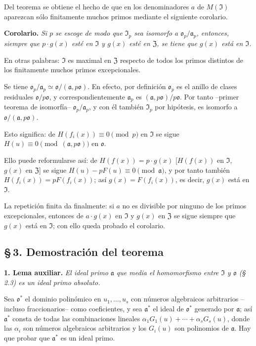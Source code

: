 Del teorema se obtiene el hecho de que en los denominadores $a$ de $M(\mathfrak{I})$ aparezcan sólo finitamente muchos primos mediante el siguiente corolario.

\medskip\noindent\textbf{Corolario.}
\emph{Si $p$ se escoge de modo que $\mathfrak{I}_p$ sea isomorfo a $\mathfrak{o}_p/\mathfrak{a}_p$, entonces, siempre que $p\cdot g(x)$ esté en $\mathfrak{I}$ y $g(x)$ esté en $\mathfrak{Z}$, se tiene que $g(x)$ está en $\mathfrak{I}$.}

En otras palabras: $\mathfrak{I}$ es maximal en $\mathfrak{Z}$ respecto de todos los primos distintos de los finitamente muchos primos excepcionales.

Se tiene $\mathfrak{o}_p/\mathfrak{a}_p\simeq\mathfrak{o}/(\mathfrak{a},p\mathfrak{o})$. En efecto, por definición $\mathfrak{o}_p$ es el anillo de clases residuales $\mathfrak{o}/p\mathfrak{o}$, y correspondientemente $\mathfrak{a}_p$ es $(\mathfrak{a},p\mathfrak{o})/p\mathfrak{o}$. Por tanto --primer teorema de isomorfía-- $\mathfrak{o}_p/\mathfrak{a}_p$, y con él también $\mathfrak{I}_p$ por hipótesis, es isomorfo a $\mathfrak{o}/(\mathfrak{a},p\mathfrak{o})$.

Esto significa: de $H(f_i(x))\equiv0\pmod p$ en $\mathfrak{I}$ se sigue $H(u)\equiv0\pmod{(\mathfrak{a},p\mathfrak{o})}$ en $\mathfrak{o}$.

Ello puede reformularse así: de $H(f(x))=p\cdot g(x)$ [$H(f(x))$ en $\mathfrak{I}$, $g(x)$ en $\mathfrak{Z}$] se sigue $H(u)-pF(u)\equiv0\pmod{\mathfrak{a}}$, y por tanto también $H(f_i(x))=pF(f_i(x))$; así $g(x)=F(f_i(x))$, es decir, $g(x)$ está en $\mathfrak{I}$.

La repetición finita da finalmente: si $a$ no es divisible por ninguno de los primos excepcionales, entonces de $a\cdot g(x)$ en $\mathfrak{I}$ y $g(x)$ en $\mathfrak{Z}$ se sigue siempre que $g(x)$ está en $\mathfrak{I}$; con ello queda probado el corolario.

\subsection*{\S\,3. Demostración del teorema}

\noindent\textbf{1. Lema auxiliar.}
\emph{El ideal primo $\mathfrak{a}$ que media el homomorfismo entre $\mathfrak{I}$ y $\mathfrak{o}$ (\S\,2.3) es un ideal primo absoluto.}

Sea $\mathfrak{o}^*$ el dominio polinómico en $u_1,\ldots,u_s$ con números algebraicos arbitrarios --incluso fraccionarios-- como coeficientes, y sea $\mathfrak{a}^*$ el ideal de $\mathfrak{o}^*$ generado por $\mathfrak{a}$; así $\mathfrak{a}^*$ consta de todas las combinaciones lineales $\alpha_1G_1(u)+\cdots+\alpha_sG_s(u)$, donde las $\alpha_i$ son números algebraicos arbitrarios y los $G_i(u)$ son polinomios de $\mathfrak{a}$. Hay que probar que $\mathfrak{a}^*$ es un ideal primo.


